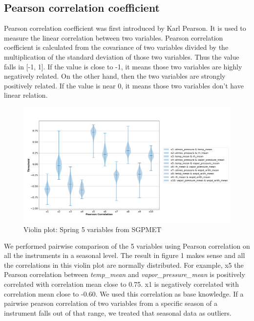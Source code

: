 \documentclass[letterpaper, 10 pt, conference]{ieeeconf}  %
\begin{document}
\subsection{Pearson correlation coefficient} 
Pearson correlation coefficient was first introduced by Karl Pearson\cite{pearson1895note}. It is used to measure the linear correlation between two variables. Pearson correlation coefficient is calculated from the covariance of two variables divided by the multiplication of the standard deviation of those two variables. Thus the value falls in [-1, 1]. If the value is close to -1, it means those two variables are highly negatively related. On the other hand, then the two variables are strongly positively related. If the value is near 0, it means those two variables don't have linear relation. 

\begin{figure}[ht]
    \centering
    \includegraphics[width=\textwidth]{Spring.png}
    \caption{Violin plot: Spring 5 variables from SGPMET}
    \label{fig:pc}
\end{figure}

We performed pairwise comparison of the 5 variables using Pearson correlation on all the instruments in a seasonal level. The result in figure 1 makes sense and all the correlations in this violin plot are normally distributed. For example, x5 the Pearson correlation between \textit{temp\_mean} and \textit{vapor\_pressure\_mean} is positively correlated with correlation mean close to 0.75. x1 is negatively correlated with correlation mean close to -0.60. We used this correlation as base knowledge. If a pairwise pearson correlation of two variables from a specific season of a instrument falls out of that range, we treated that seasonal data as outliers.
\end{document}
